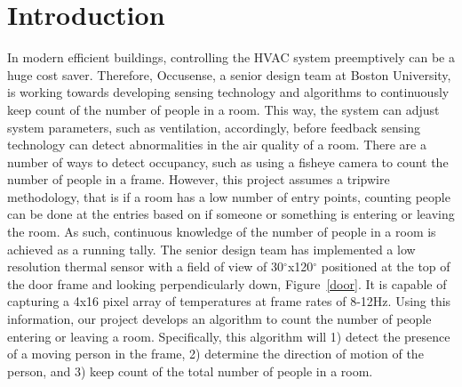 \documentclass[12pt,oneside]{article} %
\begin{document}
\tableofcontents\bueceemptypage
\listoffigures\bueceemptypage
\listoftables\bueceemptypage

\buecereportheaders

\setcounter{page}{1}

\section{Introduction}  %
In modern efficient buildings, controlling the HVAC system preemptively can be a huge cost saver. Therefore, Occusense, a senior design team at Boston University, is working towards developing sensing technology and algorithms to continuously keep count of the number of people in a room. This way, the system can adjust system parameters, such as ventilation, accordingly, before feedback sensing technology can detect abnormalities in the air quality of a room. There are a number of ways to detect occupancy, such as using a fisheye camera to count the number of people in a frame. However, this project assumes a tripwire methodology, that is if a room has a low number of entry points, counting people can be done at the entries based on if someone or something is entering or leaving the room. As such, continuous knowledge of the number of people in a room is achieved as a running tally. The senior design team has implemented a low resolution thermal sensor with a field of view of 30$^\circ$x120$^\circ$ positioned at the top of the door frame and looking perpendicularly down, Figure~\ref{door}. It is capable of capturing a 4x16 pixel array of temperatures at frame rates of 8-12Hz. Using this information, our project develops an algorithm to count the number of people entering or leaving a room. Specifically, this algorithm will 1) detect the presence of a moving person in the frame, 2) determine the direction of motion of the person, and 3) keep count of the total number of people in a room.
\end{document}
